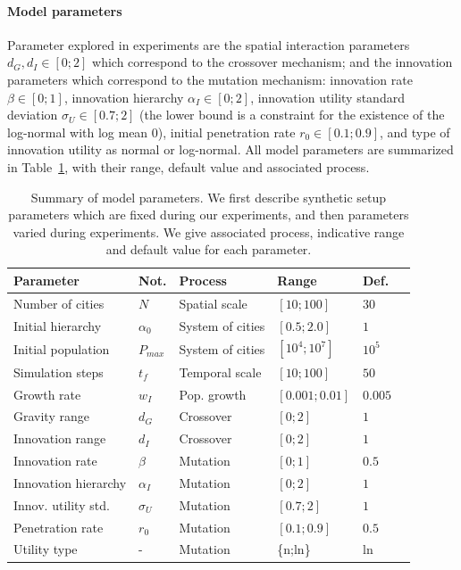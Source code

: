 \documentclass[letterpaper]{article}
\begin{document}
\paragraph{Model parameters}

Parameter explored in experiments are the spatial interaction parameters $d_G,d_I \in \left[0;2\right]$ which correspond to the crossover mechanism; and the innovation parameters which correspond to the mutation mechanism: innovation rate $\beta \in \left[0;1\right]$, innovation hierarchy $\alpha_I \in \left[0;2\right]$, innovation utility standard deviation $\sigma_U \in \left[ 0.7;2\right]$ (the lower bound is a constraint for the existence of the log-normal with log mean 0), initial penetration rate $r_0 \in \left[0.1;0.9\right]$, and type of innovation utility as normal or log-normal. All model parameters are summarized in Table~\ref{tab:params}, with their range, default value and associated process.


\begin{table}
\caption{Summary of model parameters. We first describe synthetic setup parameters which are fixed during our experiments, and then parameters varied during experiments. We give associated process, indicative range and default value for each parameter.\label{tab:params}}\medskip
	\hspace{-1cm}
	\footnotesize
	\begin{tabular}{|l|l|l|l|l|l|}
	\hline
	Parameter & Not. & Process & Range & Def. \\ \hline
	Number of cities & $N$ & Spatial scale & $[10 ; 100]$ & $30$\\
	Initial hierarchy & $\alpha_0$ & System of cities & $[0.5 ; 2.0]$ & $1$\\
	Initial population & $P_{max}$ & System of cities & $[10^4 ; 10^7]$ & $10^5$\\
	Simulation steps & $t_f$ & Temporal scale & $[10 ; 100]$ & $50$\\
	Growth rate & $w_I$ & Pop. growth & $[0.001 ; 0.01]$ & $0.005$\\\hline
	Gravity range & $d_G$ & Crossover & $[0 ; 2]$ & $1$\\
	Innovation range & $d_I$ & Crossover & $[0 ; 2]$ & $1$\\
	Innovation rate & $\beta$ & Mutation & $[0 ; 1]$ & $0.5$\\
	Innovation hierarchy & $\alpha_I$ & Mutation & $[0 ; 2]$ & $1$\\
	Innov. utility std. & $\sigma_U$ & Mutation & $\left[ 0.7;2\right]$ & $1$\\
	Penetration rate & $r_0$ & Mutation & $\left[0.1;0.9\right]$ & $0.5$\\
	Utility type & - & Mutation & \{n;ln\}& ln \\
	\hline
	\end{tabular}
\end{table}
\end{document}
